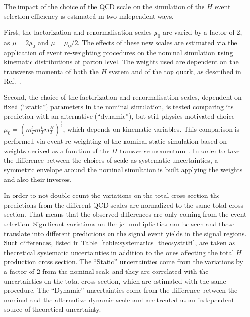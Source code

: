 The impact of the choice of the QCD scale on the simulation of the \ttbar$H$ event selection efficiency is estimated in two independent ways. 

First, the factorization and renormalisation scales $\mu_{0}$ are varied by a factor of 2, as $\mu = 2\mu_{0}$ and $\mu = \mu_{0}/2$. The effects of these new scales are estimated via the application of event re-weighting procedures on the nominal simulation using kinematic distributions at parton level. The weights used are dependent on the transverse momenta of both the \ttbar$H$ system and of the top quark, as described in Ref.~\cite{Guindon:1638000}. 

Second, the choice of the factorization and renormalisation scales, dependent on fixed (``static'') parameters in the nominal simulation, is tested comparing its prediction with an alternative (``dynamic''), but still physics motivated choice $\mu_{0} = (m_{T}^{t}m_{T}^{\bar{t}}m_{T}^{H})^{\frac{1}{3}}$, which depends on kinematic variables. This comparison is performed via event re-weighting of the nominal static simulation based on weights derived as a function of the \ttbar$H$ transverse momentum~\cite{Guindon:1638000}. In order to take the difference between the choices of scale as systematic uncertainties, a symmetric envelope around the nominal simulation is built applying the weights and also their inverses.

In order to not double-count the variations on the total cross section the predictions from the different QCD scales are normalized to the same total cross section. That means that the observed differences are only coming from the event selection.
Significant variations on the jet multiplicities can be seen and these translate into different predictions on the signal event yields in the signal regions. Such differences, listed in Table~\ref{table:systematics_theosystttH}, are taken as theoretical systematic uncertainties in addition to the ones affecting the total \ttbar$H$ production cross section. The ``Static'' uncertainties come from the variations by a factor of 2 from the nominal scale and they are correlated with the uncertainties on the total cross section, which are estimated with the same procedure. The ``Dynamic''  uncertainties come from the difference between the nominal and the alternative dynamic scale and are treated as an independent source of theoretical uncertainty. 

